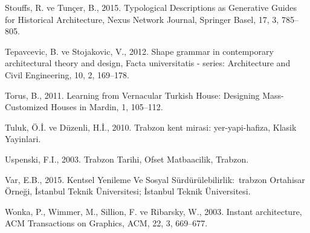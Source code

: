 \documentclass[12pt,turkish,a4paperpaper,]{report}
\begin{document}
\leavevmode\hypertarget{ref-Stouffs:2015if}{}%
Stouffs, R. ve Tunçer, B., 2015. Typological Descriptions as Generative
Guides for Historical Architecture, Nexus Network Journal, Springer
Basel, 17, 3, 785--805.

\leavevmode\hypertarget{ref-Tepavcevic:2012bl}{}%
Tepavcevic, B. ve Stojakovic, V., 2012. Shape grammar in contemporary
architectural theory and design, Facta universitatis - series:
Architecture and Civil Engineering, 10, 2, 169--178.

\leavevmode\hypertarget{ref-Torus:2011hu}{}%
Torus, B., 2011. Learning from Vernacular Turkish House: Designing
Mass-Customized Houses in Mardin, 1, 105--112.

\leavevmode\hypertarget{ref-Tuluk:2010ud}{}%
Tuluk, Ö.İ. ve Düzenli, H.İ., 2010. Trabzon kent mirasi:
yer-yapi-hafiza, Klasik Yayinlari.

\leavevmode\hypertarget{ref-Uspenski:2003ta}{}%
Uspenski, F.I., 2003. Trabzon Tarihi, Ofset Matbaacilik, Trabzon.

\leavevmode\hypertarget{ref-Var:2015vx}{}%
Var, E.B., 2015. Kentsel Yenileme Ve Sosyal Sürdürülebilirlik:~trabzon
Ortahisar Örneği, İstanbul Teknik Üniversitesi; İstanbul Teknik
Üniversitesi.

\leavevmode\hypertarget{ref-Wonka:2003bn}{}%
Wonka, P., Wimmer, M., Sillion, F. ve Ribarsky, W., 2003. Instant
architecture, ACM Transactions on Graphics, ACM, 22, 3, 669--677.
\end{document}
